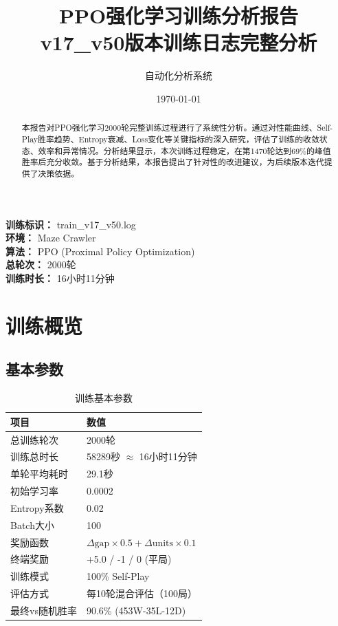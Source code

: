 \documentclass[12pt,a4paper]{article}
\title{\Huge \textbf{PPO强化学习训练分析报告} \\ \Large v17\_v50版本训练日志完整分析}
\author{自动化分析系统}
\date{\today}
\begin{document}
\maketitle

\begin{center}
\textbf{训练标识：} train\_v17\_v50.log \\
\textbf{环境：} Maze Crawler \\
\textbf{算法：} PPO (Proximal Policy Optimization) \\
\textbf{总轮次：} 2000轮 \\
\textbf{训练时长：} 16小时11分钟
\end{center}

\vspace{1cm}

\begin{abstract}
本报告对PPO强化学习2000轮完整训练过程进行了系统性分析。通过对性能曲线、Self-Play胜率趋势、Entropy衰减、Loss变化等关键指标的深入研究，评估了训练的收敛状态、效率和异常情况。分析结果显示，本次训练过程稳定，在第1470轮达到69\%的峰值胜率后充分收敛。基于分析结果，本报告提出了针对性的改进建议，为后续版本迭代提供了决策依据。
\end{abstract}

\newpage

\tableofcontents

\newpage

\section{训练概览}

\subsection{基本参数}

\begin{table}[H]
\centering
\caption{训练基本参数}
\begin{tabular}{ll}
\toprule
\textbf{项目} & \textbf{数值} \\
\midrule
总训练轮次 & 2000轮 \\
训练总时长 & 58289秒 $\approx$ 16小时11分钟 \\
单轮平均耗时 & 29.1秒 \\
初始学习率 & 0.0002 \\
Entropy系数 & 0.02 \\
Batch大小 & 100 \\
奖励函数 & $\Delta\text{gap} \times 0.5 + \Delta\text{units} \times 0.1$ \\
终端奖励 & +5.0 / -1 / 0 (平局) \\
训练模式 & 100\% Self-Play \\
评估方式 & 每10轮混合评估（100局） \\
\midrule
最终vs随机胜率 & 90.6\% (453W-35L-12D) \\
\bottomrule
\end{tabular}
\end{table}
\end{document}
